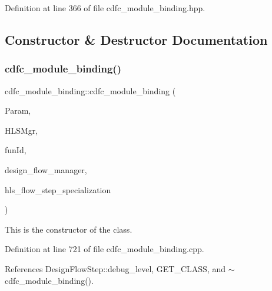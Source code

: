 Definition at line 366 of file cdfc\+\_\+module\+\_\+binding.\+hpp.



\subsection{Constructor \& Destructor Documentation}
\mbox{\label{classcdfc__module__binding_a045314febf16ce516460eb318641bfda}} 
\subsubsection{\texorpdfstring{cdfc\+\_\+module\+\_\+binding()}{cdfc\_module\_binding()}}
{\footnotesize\ttfamily cdfc\+\_\+module\+\_\+binding\+::cdfc\+\_\+module\+\_\+binding (\begin{DoxyParamCaption}\item[{const \hyperlink{Parameter_8hpp_a37841774a6fcb479b597fdf8955eb4ea}{Parameter\+Const\+Ref}}]{Param,  }\item[{const \hyperlink{hls__manager_8hpp_acd3842b8589fe52c08fc0b2fcc813bfe}{H\+L\+S\+\_\+manager\+Ref}}]{H\+L\+S\+Mgr,  }\item[{unsigned int}]{fun\+Id,  }\item[{const Design\+Flow\+Manager\+Const\+Ref}]{design\+\_\+flow\+\_\+manager,  }\item[{const \hyperlink{hls__step_8hpp_a5fdd2edf290c196531d21d68e13f0e74}{H\+L\+S\+Flow\+Step\+Specialization\+Const\+Ref}}]{hls\+\_\+flow\+\_\+step\+\_\+specialization }\end{DoxyParamCaption})}



This is the constructor of the class. 



Definition at line 721 of file cdfc\+\_\+module\+\_\+binding.\+cpp.



References Design\+Flow\+Step\+::debug\+\_\+level, G\+E\+T\+\_\+\+C\+L\+A\+SS, and $\sim$cdfc\+\_\+module\+\_\+binding().

